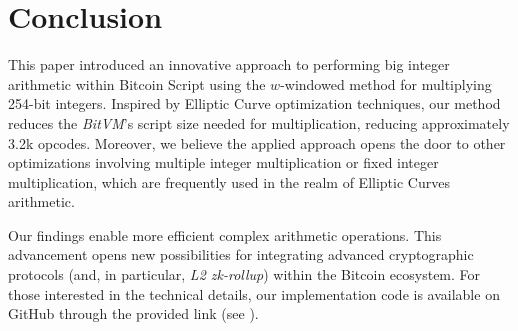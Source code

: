 \documentclass{iacrtrans}
\begin{document}
\section{Conclusion}\label{section:conclusion}

This paper introduced an innovative approach to performing big integer arithmetic within Bitcoin Script using the $w$-windowed method for multiplying 254-bit integers. Inspired by Elliptic Curve optimization techniques, our method reduces the \textit{BitVM}'s script size needed for multiplication, reducing approximately \textsf{3.2k} opcodes. Moreover, we believe the applied approach opens the door to other optimizations involving multiple integer multiplication or fixed integer multiplication, which are frequently used in the realm of Elliptic Curves arithmetic.

Our findings enable more efficient complex arithmetic operations. This advancement opens new possibilities for integrating advanced cryptographic protocols (and, in particular, \textit{L2 zk-rollup}) within the Bitcoin ecosystem. For those interested in the technical details, our implementation code is available on GitHub through the provided link (see ).

 
 
\end{document}
